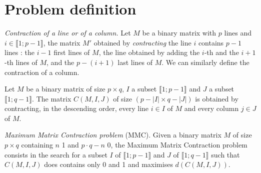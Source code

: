 \section{Problem definition}

\begin{comment}
\begin{itemize}
\item Definir $L_i$ et $C_j$, les matrices de contraction. 
\item Définir la contraction par 1 ligne ou 1 colonne
\item Définir la contraction par plusieurs lignes et/ou plusieurs colonnes
\item Définir les contractions légales. 
\item Définir la densité
\item Définir le problème
\item Version programme mathématique?
\end{itemize}
\end{comment}

\begin{definition} \emph{Contraction of a line or of a column.}
Let $M$ be a binary matrix with $p$ lines and $i \in \llbracket 1; p-1 \rrbracket$, the matrix $M'$ obtained by \emph{contracting} the line $i$ contains $p-1$ lines : the $i-1$ first lines of $M$, the line obtained by adding the $i$-th and the $i+1$-th lines of $M$, and the $p - (i+1)$ last lines of $M$. We can similarly define the contraction of a column.
\end{definition}

\begin{definition}
Let $M$ be a binary matrix of size $p \times q$, $I$ a subset $\llbracket 1;p-1 \rrbracket$ and $J$ a subset $\llbracket 1;q-1 \rrbracket$. The matrix $C(M,I,J)$ of size $(p-|I| \times q- |J|)$ is obtained by contracting, in the descending order, every line $i \in I$ of $M$ and every column $j \in J$ of $M$. 
\end{definition}

\begin{problem}
\emph{Maximum Matrix Contraction problem} (MMC). Given a binary matrix $M$ of size $p \times q$ containing $n$ 1 and $p \cdot q - n$ 0, the Maximum Matrix Contraction problem consists in the search for a subset $I$ of $\llbracket 1; p-1 \rrbracket$ and $J$ of $\llbracket 1 ; q-1 \rrbracket$ such that $C(M,I,J)$ does contains only 0 and 1 and maximises $d(C(M,I,J))$.

\end{problem}
